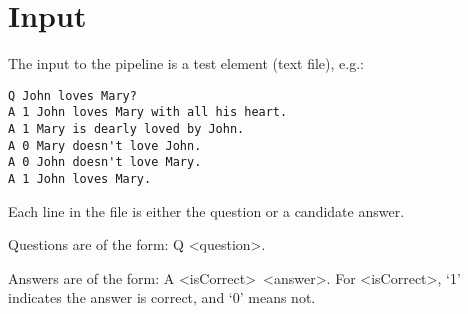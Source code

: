 \section{Input}


The input to the pipeline is a test element (text file), e.g.:

\begin{verbatim}
Q John loves Mary?
A 1 John loves Mary with all his heart.
A 1 Mary is dearly loved by John.
A 0 Mary doesn't love John.
A 0 John doesn't love Mary.
A 1 John loves Mary.
\end{verbatim}

Each line in the file is either the
question or a candidate answer.

Questions are of the form: Q \textless question\textgreater.

Answers are of the form: A \textless isCorrect\textgreater ~\textless answer\textgreater.
For \textless isCorrect\textgreater, `1' indicates the answer is correct, and `0' means not.

 